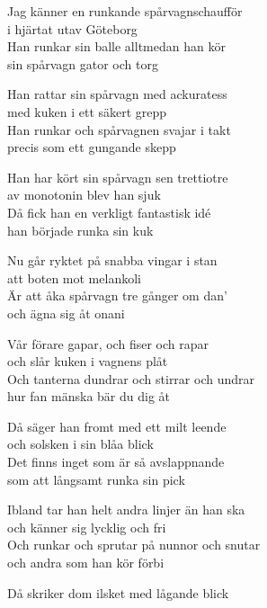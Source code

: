 \vspace{10pt}
Jag känner en runkande spårvagnschaufför\\
i hjärtat utav Göteborg\\
Han runkar sin balle alltmedan han kör\\
sin spårvagn gator och torg\par
\vspace{7pt}
Han rattar sin spårvagn med ackuratess\\
med kuken i ett säkert grepp\\
Han runkar och spårvagnen svajar i takt\\
precis som ett gungande skepp\par
\vspace{7pt}
Han har kört sin spårvagn sen trettiotre\\
av monotonin blev han sjuk\\
Då fick han en verkligt fantastisk idé\\
han började runka sin kuk\par
\vspace{7pt}
Nu går ryktet på snabba vingar i stan\\
att boten mot melankoli\\
Är att åka spårvagn tre gånger om dan’\\
och ägna sig åt onani\par
\vspace{7pt}
Vår förare gapar, och fiser och rapar\\
och slår kuken i vagnens plåt\\
Och tanterna dundrar och stirrar och undrar\\
hur fan mänska bär du dig åt\par
\vspace{7pt}
Då säger han fromt med ett milt leende\\
och solsken i sin blåa blick\\
Det finns inget som är så avslappnande\\
som att långsamt runka sin pick\par
\newpage
Ibland tar han helt andra linjer än han ska\\
och känner sig lycklig och fri\\
Och runkar och sprutar på nunnor och snutar\\
och andra som han kör förbi\par
\vspace{8pt}
Då skriker dom ilsket med lågande blick\\
